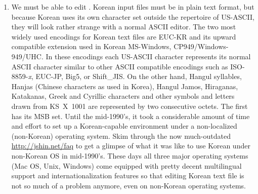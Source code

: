 \begin{enumerate}
\item 
We must be able to 
edit .
Korean input files must be in plain text format, but because Korean
uses its own character set outside the
repertoire of US-ASCII, they will look rather strange with a normal ASCII editor.  The two most widely used encodings for
Korean text files are  EUC-KR and its upward compatible
extension used in Korean MS-Windows, CP949/Windows-949/UHC.
In these encodings each US-ASCII character represents its normal ASCII
character similar to other ASCII compatible encodings such as
ISO-8859-\textit{x}, EUC-JP, Big5, or Shift\_JIS. On the other hand, Hangul
syllables, Hanjas (Chinese characters as used in Korea), Hangul Jamos,
Hiraganas, Katakanas, Greek and Cyrillic characters and other
symbols and letters drawn from KS~X~1001 are represented by two
consecutive octets. The first has its MSB set.
Until the mid-1990's, it took a considerable amount of time and effort to
set up a Korean-capable environment under a non-localized (non-Korean)
operating system. 
Skim through the now much-outdated \url{http://jshin.net/faq} to get 
a glimpse of what it was like to use Korean under non-Korean OS in mid-1990's.
These days all three major operating systems (Mac OS, Unix, Windows) come equipped
with pretty decent multilingual support and internationalization features
so that editing Korean text file is not so much of a problem anymore, even
on non-Korean operating systems.


\end{enumerate}
